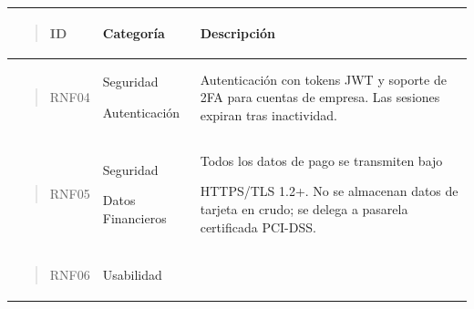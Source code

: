 \documentclass[
]{article}
\newcounter{none} %
\begin{document}
{\def\LTcaptype{none} %
\begin{longtable}[]{@{}
  >{\raggedright\arraybackslash}p{}
  >{\raggedright\arraybackslash}p{}
  >{\raggedright\arraybackslash}p{}@{}}
\toprule\noalign{}
\begin{minipage}[b]{\linewidth}\raggedright
\begin{quote}
ID
\end{quote}
\end{minipage} & \begin{minipage}[b]{\linewidth}\raggedright
Categoría
\end{minipage} & \begin{minipage}[b]{\linewidth}\raggedright
Descripción
\end{minipage} \\
\midrule\noalign{}
\endhead
\bottomrule\noalign{}
\endlastfoot
\begin{minipage}[t]{\linewidth}\raggedright
\begin{quote}
RNF04
\end{quote}
\end{minipage} & Seguridad

Autenticación & Autenticación con tokens JWT y soporte de 2FA para
cuentas de empresa. Las sesiones expiran tras inactividad. \\
\begin{minipage}[t]{\linewidth}\raggedright
\begin{quote}
RNF05
\end{quote}
\end{minipage} & Seguridad

Datos Financieros & Todos los datos de pago se transmiten bajo

HTTPS/TLS 1.2+. No se almacenan datos de tarjeta en crudo; se delega a
pasarela certificada PCI-DSS. \\
\begin{minipage}[t]{\linewidth}\raggedright
\begin{quote}
RNF06
\end{quote}
\end{minipage} & Usabilidad


\end{longtable}}
\end{document}
